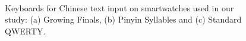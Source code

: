 \begin{figure}
  \caption{Keyboards for Chinese text input on smartwatches used in our study: (a) Growing Finals, (b) Pinyin Syllables and (c) Standard QWERTY.}~\label{fig:figure1}
\end{figure}
